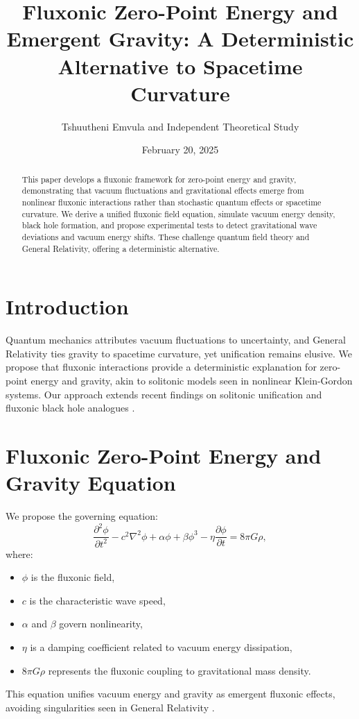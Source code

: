 \documentclass{article}
\title{Fluxonic Zero-Point Energy and Emergent Gravity: A Deterministic Alternative to Spacetime Curvature}
\author{Tshuutheni Emvula and Independent Theoretical Study}
\date{February 20, 2025}
\begin{document}
\maketitle

\begin{abstract}
This paper develops a fluxonic framework for zero-point energy and gravity, demonstrating that vacuum fluctuations and gravitational effects emerge from nonlinear fluxonic interactions rather than stochastic quantum effects or spacetime curvature. We derive a unified fluxonic field equation, simulate vacuum energy density, black hole formation, and propose experimental tests to detect gravitational wave deviations and vacuum energy shifts. These challenge quantum field theory and General Relativity, offering a deterministic alternative.
\end{abstract}

\section{Introduction}
Quantum mechanics attributes vacuum fluctuations to uncertainty, and General Relativity ties gravity to spacetime curvature, yet unification remains elusive. We propose that fluxonic interactions provide a deterministic explanation for zero-point energy and gravity, akin to solitonic models seen in nonlinear Klein-Gordon systems. Our approach extends recent findings on solitonic unification \cite{soliton_unification} and fluxonic black hole analogues \cite{fluxonic_black_holes}.

\section{Fluxonic Zero-Point Energy and Gravity Equation}
We propose the governing equation:
\begin{equation}
\frac{\partial^2 \phi}{\partial t^2} - c^2 \nabla^2 \phi + \alpha \phi + \beta \phi^3 - \eta \frac{\partial \phi}{\partial t} = 8 \pi G \rho,
\end{equation}
where:
\begin{itemize}
    \item $\phi$ is the fluxonic field,
    \item $c$ is the characteristic wave speed,
    \item $\alpha$ and $\beta$ govern nonlinearity,
    \item $\eta$ is a damping coefficient related to vacuum energy dissipation,
    \item $8 \pi G \rho$ represents the fluxonic coupling to gravitational mass density.
\end{itemize}
This equation unifies vacuum energy and gravity as emergent fluxonic effects, avoiding singularities seen in General Relativity \cite{fluxonic_gravity}.
\end{document}
